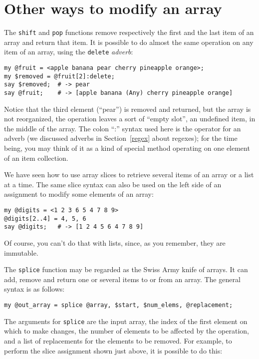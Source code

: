 \section{Other ways to modify an array}
\label{modify_array}

The {\tt shift} and {\tt pop} functions remove respectively 
the first and the last item of an array and return that 
item. It is possible to do almost the same operation on any item 
of an array, using the {\tt delete} \emph{adverb}:

\begin{verbatim}
my @fruit = <apple banana pear cherry pineapple orange>;
my $removed = @fruit[2]:delete; 
say $removed;  # -> pear
say @fruit;    # -> [apple banana (Any) cherry pineapple orange]
\end{verbatim}

Notice that the third element (``pear'') is removed and 
returned, but the array is not reorganized, the operation leaves 
a sort of ``empty slot'', an undefined item, in the 
middle of the array. The colon ``:'' syntax used here is the 
operator for an adverb (we discussed adverbs in  
Section~\ref{regex} about regexes); 
for the time being, you may think of it as a kind of special 
method operating on one element of an item collection.

We have seen how to use array slices to retrieve several 
items of an array or a list at a time. The same slice syntax 
can also be used on the left side of an assignment to modify 
some elements of an array:

\begin{verbatim}
my @digits = <1 2 3 6 5 4 7 8 9>
@digits[2..4] = 4, 5, 6
say @digits;   # -> [1 2 4 5 6 4 7 8 9]
\end{verbatim}

Of course, you can't do that with lists, since, as you 
remember, they are immutable.

The {\tt splice} function may be regarded as the Swiss Army 
knife of arrays. It can add, remove and return one or 
several items to or from an array. The general syntax is 
as follows:

\begin{verbatim}
my @out_array = splice @array, $start, $num_elems, @replacement;
\end{verbatim}
%
The arguments for {\tt splice} are the input array, the index 
of the first element on which to make changes, the number of 
elements to be affected by the operation, and a list of 
replacements for the elements to be removed. For example, 
to perform the slice assignment shown just above, it is 
possible to do this:

